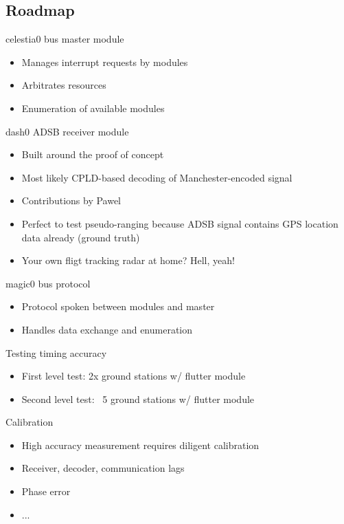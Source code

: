 \subsection{Roadmap}
	\begin{frame}{celestia0 bus master module}
		\begin{itemize}
			\item Manages interrupt requests by modules
			\item Arbitrates resources
			\item Enumeration of available modules
		\end{itemize}
	\end{frame}
	\begin{frame}{dash0 ADSB receiver module}
		\begin{itemize}
			\item Built around the proof of concept
			\item Most likely CPLD-based decoding of Manchester-encoded signal
			\item Contributions by Pawel
			\item Perfect to test pseudo-ranging because ADSB signal contains GPS location data already (ground truth)
			\item Your own fligt tracking radar at home?  Hell, yeah!
		\end{itemize}
	\end{frame}
	\begin{frame}{magic0 bus protocol}
		\begin{itemize}
			\item Protocol spoken between modules and master
			\item Handles data exchange and enumeration
		\end{itemize}
	\end{frame}
	\begin{frame}{Testing timing accuracy}
		\begin{itemize}
			\item First level test: 2x ground stations w/ flutter module
			\item Second level test: ~5 ground stations w/ flutter module
		\end{itemize}
	\end{frame}
	\begin{frame}{Calibration}
		\begin{itemize}
			\item High accuracy measurement requires diligent calibration
			\item Receiver, decoder, communication lags
			\item Phase error
			\item ...
		\end{itemize}
	\end{frame}
